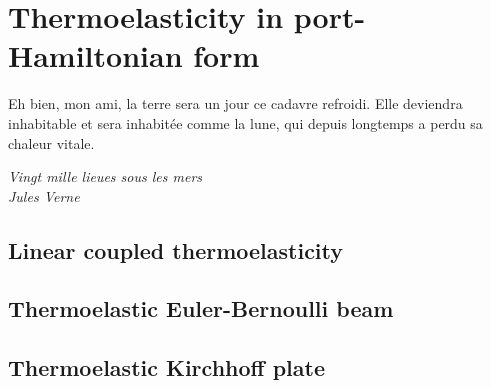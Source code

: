 \chapter{Thermoelasticity in port-Hamiltonian form}

\epigraph{Eh bien, mon ami, la terre sera un jour ce cadavre refroidi. Elle deviendra inhabitable et sera inhabitée comme la lune, qui depuis longtemps a perdu sa chaleur vitale.}{\textit{Vingt mille lieues sous les mers\\
Jules Verne}}
\minitoc
 

\cite{duhamel1837}

\section{Linear coupled thermoelasticity}

\section{Thermoelastic Euler-Bernoulli beam}

\section{Thermoelastic Kirchhoff plate}
